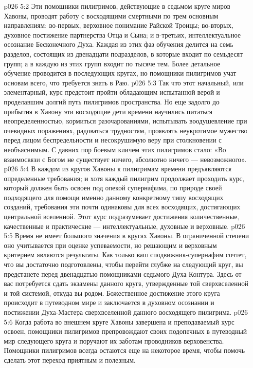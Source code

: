 \vs p026 5:2 Эти помощники пилигримов, действующие в седьмом круге миров Хавоны, проводят работу с восходящими смертными по трем основным направлениям: во\hyp{}первых, верховное понимание Райской Троицы; во\hyp{}вторых, духовное постижение партнерства Отца и Сына; и в\hyp{}третьих, интеллектуальное осознание Бесконечного Духа. Каждая из этих фаз обучения делится на семь разделов, состоящих из двенадцати подразделов, в которые входит по семьдесят групп; а в каждую из этих групп входит по тысяче тем. Более детальное обучение проводится в последующих кругах, но помощники пилигримов учат основам всего, что требуется знать в Раю.
\vs p026 5:3 Так что этот начальный, или элементарный, курс предстоит пройти обладающим испытанной верой и проделавшим долгий путь пилигримов пространства. Но еще задолго до прибытия в Хавону эти восходящие дети времени научились питаться неопределенностью, кормиться разочарованиями, испытывать воодушевление при очевидных поражениях, радоваться трудностям, проявлять неукротимое мужество перед лицом беспредельности и несокрушимую веру при столкновении с необъяснимым. С давних пор боевым кличем этих пилигримов стало: «Во взаимосвязи с Богом не существует ничего, абсолютно ничего --- невозможного».
\vs p026 5:4 В каждом из кругов Хавоны к пилигримам времени предъявляются определенные требования; и хотя каждый пилигрим продолжает проходить курс, который должен быть освоен под опекой супернафима, по природе своей подходящего для помощи именно данному конкретному типу восходящих созданий, требования эти почти одинаковы для всех восходящих, достигающих центральной вселенной. Этот курс подразумевает достижения количественные, качественные и практические --- интеллектуальные, духовные и верховные.
\vs p026 5:5 Время не имеет большого значения в кругах Хавоны. В ограниченной степени оно учитывается при оценке успеваемости, но решающим и верховным критерием являются результаты. Как только ваш сподвижник\hyp{}супернафим сочтет, что вы достаточно подготовлены, чтобы перейти глубже на следующий круг, вы предстанете перед двенадцатью помощниками седьмого Духа Контура. Здесь от вас потребуется сдать экзамены данного круга, утвержденные той сверхвселенной и той системой, откуда вы родом. Божественное достижение этого круга происходит в путеводном мире и заключается в духовном осознании и постижении Духа\hyp{}Мастера сверхвселенной данного восходящего пилигрима.
\vs p026 5:6 Когда работа во внешнем круге Хавоны завершена и преподаваемый курс освоен, помощники пилигримов препровождают своих подопечных в путеводный мир следующего круга и поручают их заботам проводников верховенства. Помощники пилигримов всегда остаются еще на некоторое время, чтобы помочь сделать этот переход приятным и полезным.

